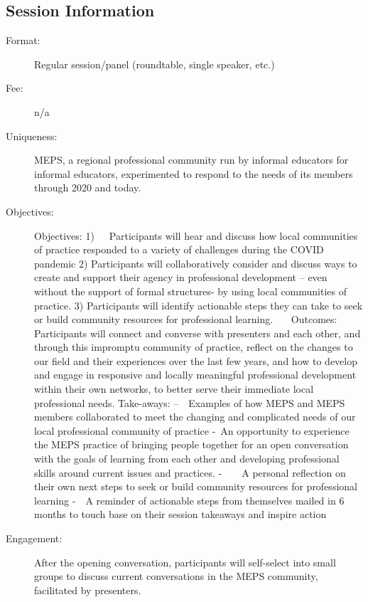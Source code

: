 \documentclass{report}
\begin{document}
              \subsection*{Session Information}
                \begin{description}
                  \item [Format:] Regular session/panel (roundtable, single speaker, etc.)
							    
								  \item [Fee:]n/a
							     
							    \item [Uniqueness:]MEPS, a regional professional community run by informal educators for informal educators, experimented to respond to the needs of its members through 2020 and today.
							    \item [Objectives:]Objectives:
1)   Participants will hear and discuss how local communities of practice responded to a variety of challenges during the COVID pandemic
2) Participants will collaboratively consider and discuss ways to create and support their agency in professional development – even without the support of formal structures- by using local communities of practice. 
3) Participants will identify actionable steps they can take to seek or build community resources for professional learning.   
Outcomes:
Participants will connect and converse with presenters and each other, and through this impromptu community of practice, reflect on the changes to our field and their experiences over the last few years, and how to develop and engage in responsive and locally meaningful professional development within their own networks, to better serve their immediate local professional needs.
Take-aways:
--  Examples of how MEPS and MEPS members collaborated to meet the changing and complicated needs of our local professional community of practice
- An opportunity to experience the MEPS practice of bringing people together for an open conversation with the goals of learning from each other and developing professional skills around current issues and practices.
-    A personal reflection on their own next steps to seek or build community resources for professional learning 
-  A reminder of actionable steps from themselves mailed in 6 months to touch base on their session takeaways and inspire action
							    \item [Engagement:]After the opening conversation, participants will self-select into small groups to discuss current conversations in the MEPS community, facilitated by presenters.

\end{description}
\end{document}
